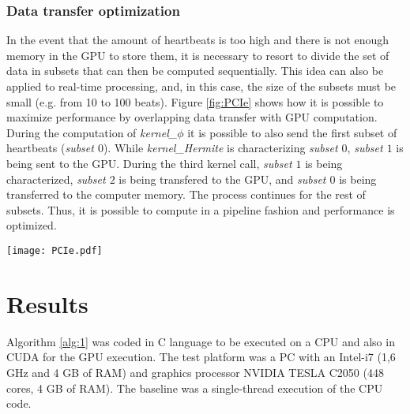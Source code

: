 \documentclass[runningheads]{llncs}
\begin{document}
\subsubsection{Data transfer optimization\\}
In the event that the amount of heartbeats is too high and there is not enough memory in the GPU to store them, it is necessary to resort to divide the set of data in subsets that can then be computed sequentially. This idea can also be applied to real-time processing, and, in this case, the size of the subsets must be small (e.g. from 10 to 100 beats). Figure \ref{fig:PCIe} shows how it is possible to maximize performance by overlapping data transfer with GPU computation. During the computation of \textit{kernel\_$\phi$} it is possible to also send the first subset of heartbeats (\textit{subset $0$}). While \textit{kernel\_Hermite} is characterizing \textit{subset $0$}, \textit{subset $1$} is being sent to the GPU. During the third kernel call, \textit{subset $1$} is being characterized,  \textit{subset $2$} is being transfered to the GPU, and \textit{subset $0$}  is being transferred to the computer memory. The process continues for the rest of subsets. Thus, it is possible to compute in a pipeline fashion and performance is optimized.

\begin{figure*}\label{fig:PCIe}
	\centering
		\texttt{[image: PCIe.pdf]}
	\caption{Streaming processing to optimize performance for real-time processing and the processing of very long ECG recordings }
\end{figure*}


\section{Results}\label{s:results}
Algorithm \ref{alg:1} was coded in C language to be executed on a CPU and also in CUDA for the GPU execution. The test platform was a PC with an Intel-i7 (1,6 GHz and 4 GB of RAM) and graphics processor NVIDIA TESLA C2050 (448 cores, 4 GB of RAM). The baseline was a single-thread execution of the CPU code.
\end{document}
